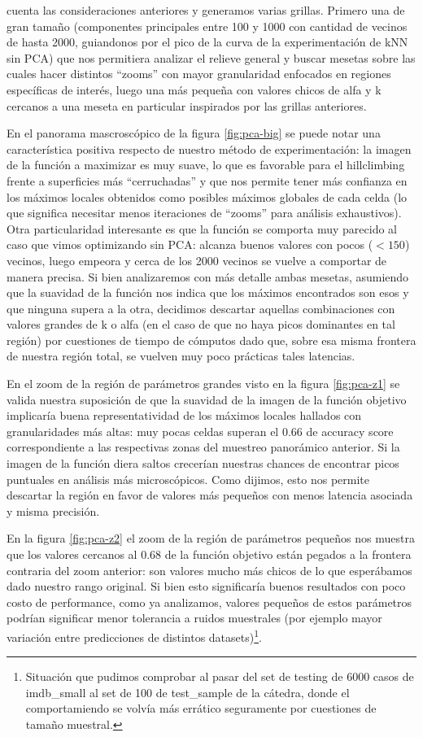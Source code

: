 cuenta las consideraciones anteriores y generamos varias grillas. Primero una
de gran tamaño (componentes principales entre 100 y 1000 con cantidad de vecinos de hasta 2000, guiandonos por el pico de la curva de la experimentación de kNN sin PCA) que nos permitiera analizar el relieve general y buscar mesetas sobre las cuales hacer distintos ``zooms'' con mayor granularidad enfocados en regiones específicas de interés, luego una más pequeña con valores chicos de alfa y k cercanos a una meseta en particular inspirados por las grillas anteriores.

En el panorama mascroscópico de la figura \ref{fig:pca-big} se puede notar una característica positiva respecto de nuestro método de experimentación: la imagen de la función a maximizar es muy suave, lo que es favorable para el hillclimbing frente a superficies más ``cerruchadas'' y que nos permite tener más confianza en los máximos locales obtenidos como posibles máximos globales de cada celda (lo que significa necesitar menos iteraciones de ``zooms'' para análisis exhaustivos). Otra particularidad interesante es que la función se comporta muy parecido al caso que vimos optimizando sin PCA: alcanza buenos valores con pocos ($<150$) vecinos, luego empeora y cerca de los 2000 vecinos se vuelve a comportar de manera precisa. Si bien analizaremos con más detalle ambas mesetas, asumiendo que la suavidad de la función nos indica que los máximos encontrados son esos y que ninguna supera a la otra, decidimos descartar aquellas combinaciones con valores grandes de k o alfa (en el caso de que no haya picos dominantes en tal región) por cuestiones de tiempo de cómputos dado que, sobre esa misma frontera de nuestra región total, se vuelven muy poco prácticas tales latencias.

En el zoom de la región de parámetros grandes visto en la figura \ref{fig:pca-z1} se valida nuestra suposición de que la suavidad de la imagen de la función objetivo implicaría buena representatividad de los máximos locales hallados con granularidades más altas: muy pocas celdas superan el $0.66$ de accuracy score correspondiente a las respectivas zonas del muestreo panorámico anterior. Si la imagen de la función diera saltos crecerían nuestras chances de encontrar picos puntuales en análisis más microscópicos. Como dijimos, esto nos permite descartar la región en favor de valores más pequeños con menos latencia asociada y misma precisión.

En la figura \ref{fig:pca-z2} el zoom de la región de parámetros pequeños nos muestra que los valores cercanos al 0.68 de la función objetivo están pegados a la frontera contraria del zoom anterior: son valores mucho más chicos de lo que esperábamos dado nuestro rango original. Si bien esto significaría buenos resultados con poco costo de performance, como ya analizamos, valores pequeños de estos parámetros podrían significar menor tolerancia a ruidos muestrales (por ejemplo mayor variación entre predicciones de distintos datasets)\footnote{Situación que pudimos comprobar al pasar del set de testing de 6000 casos de imdb\_small al set de 100 de test\_sample de la cátedra, donde el comportamiendo se volvía más errático seguramente por cuestiones de tamaño muestral.}.

